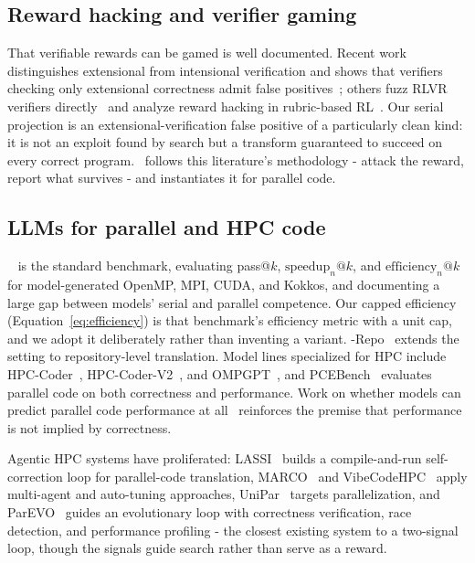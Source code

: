 \subsection{Reward hacking and verifier gaming}

That verifiable rewards can be gamed is well documented. Recent work
distinguishes extensional from intensional verification and shows that
verifiers checking only extensional correctness admit false
positives~\cite{gamingverifiers}; others fuzz RLVR verifiers
directly~\cite{fuzzverifiers} and analyze reward hacking in rubric-based
RL~\cite{rubrichack}. Our serial projection is an extensional-verification
false positive of a particularly clean kind: it is not an exploit found by
search but a transform guaranteed to succeed on every correct program. \PG\
follows this literature's methodology - attack the reward, report what
survives - and instantiates it for parallel code.

\subsection{LLMs for parallel and HPC code}

\ParEval~\cite{pareval} is the standard benchmark, evaluating pass@$k$,
$\mathrm{speedup}_n@k$, and $\mathrm{efficiency}_n@k$ for model-generated
OpenMP, MPI, CUDA, and Kokkos, and documenting a large gap between models'
serial and parallel competence. Our capped efficiency
(Equation~\eqref{eq:efficiency}) is that benchmark's efficiency metric with a
unit cap, and we adopt it deliberately rather than inventing a variant.
\ParEval-Repo~\cite{parevalrepo} extends the setting to repository-level
translation. Model lines specialized for HPC include
HPC-Coder~\cite{hpccoder}, HPC-Coder-V2~\cite{hpccoderv2}, and
OMPGPT~\cite{ompgpt}, and PCEBench~\cite{pcebench} evaluates parallel code on
both correctness and performance. Work on whether models can predict parallel
code performance at all~\cite{predictperf} reinforces the premise that
performance is not implied by correctness.

Agentic HPC systems have proliferated: LASSI~\cite{lassi} builds a
compile-and-run self-correction loop for parallel-code translation,
MARCO~\cite{marco} and VibeCodeHPC~\cite{vibecodehpc} apply multi-agent and
auto-tuning approaches, UniPar~\cite{unipar} targets parallelization, and
ParEVO~\cite{parevo} guides an evolutionary loop with correctness
verification, race detection, and performance profiling - the closest existing
system to a two-signal loop, though the signals guide search rather than serve
as a reward.

